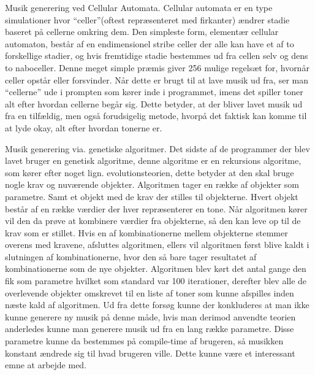 Musik generering ved Cellular Automata.
Cellular automata er en type simulationer hvor “celler”(oftest repræsenteret med firkanter) ændrer stadie baseret på cellerne omkring dem. Den simpleste form, elementær cellular automaton, består af en endimensionel stribe celler der alle kan have et af to forskellige stadier, og hvis fremtidige stadie bestemmes ud fra cellen selv og dens to naboceller. Denne meget simple præmis giver 256 mulige regelsæt for, hvornår celler opstår eller forsvinder.\cite{wolframCA}
Når dette er brugt til at lave musik ud fra, ser man “cellerne” ude i prompten som kører inde i programmet, imens det spiller toner alt efter hvordan cellerne begår sig. Dette betyder, at der bliver lavet musik ud fra en tilfældig, men også forudsigelig metode, hvorpå det faktisk kan komme til at lyde okay, alt efter hvordan tonerne er. \cite{citation+needed}

Musik generering via. genetiske algoritmer.
Det sidste af de programmer der blev lavet bruger en genetisk algoritme, denne algoritme er en rekursions algoritme, som kører efter noget lign. evolutionsteorien, dette betyder at den skal bruge nogle krav og nuværende objekter. Algoritmen tager en række af objekter som parametre. Samt et objekt med de krav der stilles til objekterne. Hvert objekt består af en række værdier der hver repræsenterer en tone. 
Når algoritmen kører vil den da prøve at kombinere værdier fra objekterne, så den kan leve op til de krav som er stillet. Hvis en af kombinationerne mellem objekterne stemmer overens med kravene, afsluttes algoritmen, ellers vil algoritmen først blive kaldt i slutningen af kombinationerne, hvor den så bare tager resultatet af kombinationerne som de nye objekter.
Algoritmen blev kørt det antal gange den fik som parametre hvilket som standard var 100 iterationer, derefter blev alle de overlevende objekter omskrevet til en liste af toner som kunne afspilles inden næste kald af algoritmen. Ud fra dette forsøg kunne der konkluderes at man ikke kunne generere ny musik på denne måde, hvis man derimod anvendte teorien anderledes kunne man generere musik ud fra en lang række parametre. Disse parametre kunne da bestemmes på compile-time af brugeren, så musikken konstant ændrede sig til hvad brugeren ville. Dette kunne være et interessant emne at arbejde med.\cite{citation+needed}


